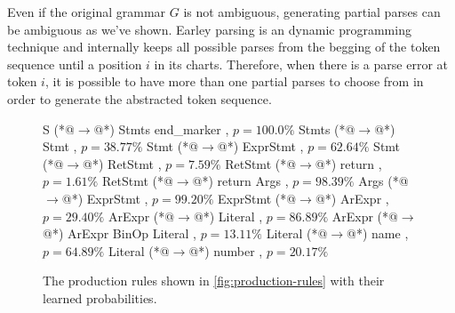  Even if the original grammar $G$ is
not ambiguous, generating partial parses can be ambiguous as we've shown. Earley
parsing is an dynamic programming technique and internally keeps all possible
parses from the begging of the token sequence until a position $i$ in its
charts. Therefore, when there is a parse error at token $i$, it is possible to
have more than one partial parses to choose from in order to generate the
abstracted token sequence.


\begin{figure}[t]
\begin{rules}
S        (*@$\rightarrow$@*) Stmts end_marker        , $p = 100.0\%$
Stmts    (*@$\rightarrow$@*) Stmt \n                 , $p = 38.77\%$
Stmt     (*@$\rightarrow$@*) ExprStmt                , $p = 62.64\%$
Stmt     (*@$\rightarrow$@*) RetStmt                 , $p =  7.59\%$
RetStmt  (*@$\rightarrow$@*) return                  , $p =  1.61\%$
RetStmt  (*@$\rightarrow$@*) return Args             , $p = 98.39\%$
Args     (*@$\rightarrow$@*) ExprStmt                , $p = 99.20\%$
ExprStmt (*@$\rightarrow$@*) ArExpr                  , $p = 29.40\%$
ArExpr   (*@$\rightarrow$@*) Literal                 , $p = 86.89\%$
ArExpr   (*@$\rightarrow$@*) ArExpr BinOp Literal    , $p = 13.11\%$
Literal  (*@$\rightarrow$@*) name                    , $p = 64.89\%$
Literal  (*@$\rightarrow$@*) number                  , $p = 20.17\%$
\end{rules}
\caption{The production rules shown in \autoref{fig:production-rules} with
their learned probabilities.}
\label{fig:weighted-production-rules}
\end{figure}

